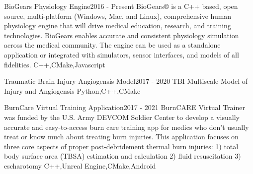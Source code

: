 %
%
%


\begin{projects}
	\project
	{BioGears Physiology Engine}{2016 - Present}
	{} 
	{BioGears® is a C++ based, open source, multi-platform (Windows, Mac, and Linux), comprehensive human physiology engine that will drive medical education, research, and training technologies. BioGears enables accurate and consistent physiology simulation across the medical community. The engine can be used as a standalone application or integrated with simulators, sensor interfaces, and models of all fidelities.}
	{C++,CMake,Javascript}
				
	\project
	{Traumatic Brain Injury Angiogensis Model}{2017 - 2020}
	{} 
	{TBI Multiscale Model of Injury and Angiogensis}
	{Python,C++,CMake}

	\project
	{BurnCare Virtual Training Application}{2017 - 2021}
	{} 
	{BurnCARE Virtual Trainer was funded by the U.S. Army DEVCOM Soldier Center to develop a visually accurate and easy-to-access burn care training app for medics who don’t usually treat or know much about treating burn injuries. This application focuses on three core aspects of proper post-debridement thermal burn injuries:
	1) total body surface area (TBSA) estimation and calculation
	2) fluid resuscitation
	3) escharotomy}
	{C++,Unreal Engine,CMake,Android}

\end{projects}

